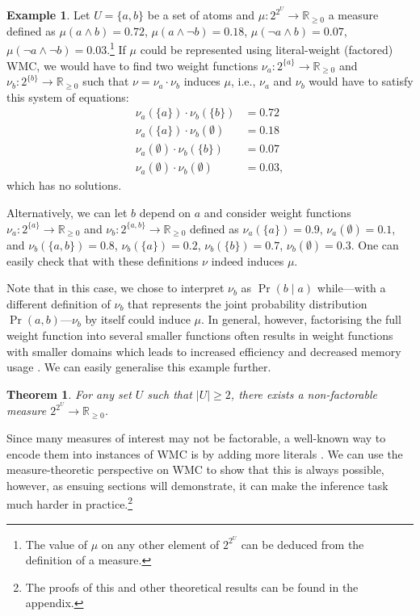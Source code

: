 \documentclass{uai2021} %
\newtheorem{theorem}{Theorem}
\theoremstyle{definition}
\newtheorem{example}{Example}
\begin{document}
\begin{example}
  Let $U = \{a, b\}$ be a set of atoms and $\mu\colon 2^{2^U} \to
  \mathbb{R}_{\ge 0}$ a measure defined as $\mu(a \land b) = 0.72$, $\mu(a \land
  \neg b) = 0.18$, $\mu(\neg a \land b) = 0.07$, $\mu(\neg a \land \neg b) =
  0.03$.\footnote{The value of $\mu$ on any other element of $2^{2^U}$ can be
    deduced from the definition of a measure.} If $\mu$ could be represented
  using literal-weight (factored) WMC, we would have to find two weight
  functions $\nu_a\colon 2^{\{a\}} \to \mathbb{R}_{\ge 0}$ and $\nu_b\colon
  2^{\{b\}} \to \mathbb{R}_{\ge 0}$ such that $\nu = \nu_a \cdot \nu_b$ induces
  $\mu$, i.e., $\nu_a$ and $\nu_b$ would have to satisfy this system of
  equations:
  \begin{align*}
    \nu_a(\{a\}) \cdot \nu_b(\{b\}) &= 0.72 \\
    \nu_a(\{a\}) \cdot \nu_b(\emptyset) &= 0.18 \\
    \nu_a(\emptyset) \cdot \nu_b(\{b\}) &= 0.07 \\
    \nu_a(\emptyset) \cdot \nu_b(\emptyset) &= 0.03,
  \end{align*}
  which has no solutions.

  Alternatively, we can let $b$ depend on $a$ and consider weight functions
  $\nu_a\colon 2^{\{a\}} \to \mathbb{R}_{\ge 0}$ and $\nu_b\colon 2^{\{a, b\}}
  \to \mathbb{R}_{\ge 0}$ defined as $\nu_a(\{a\}) = 0.9$, $\nu_a(\emptyset) =
  0.1$, and $\nu_b(\{a, b\}) = 0.8$, $\nu_b(\{a\}) = 0.2$, $\nu_b(\{b\}) = 0.7$,
  $\nu_b(\emptyset) = 0.3$. One can easily check that with these definitions
  $\nu$ indeed induces $\mu$.
\end{example}

Note that in this case, we chose to interpret $\nu_b$ as $\Pr(b \mid a)$
while---with a different definition of $\nu_b$ that represents the joint
probability distribution $\Pr(a, b)$---$\nu_b$ by itself could induce $\mu$. In
general, however, factorising the full weight function into several smaller
functions often results in weight functions with smaller domains which leads to
increased efficiency and decreased memory usage
\citep{DBLP:conf/aaai/DudekPV20}. We can easily generalise this example further.

\begin{theorem}
  For any set $U$ such that $|U| \ge 2$, there exists a non-factorable measure
  $2^{2^{U}} \to \mathbb{R}_{\ge 0}$.
\end{theorem}

Since many measures of interest may not be factorable, a well-known way to
encode them into instances of WMC is by adding more literals
\citep{DBLP:journals/ai/ChaviraD08}. We can use the measure-theoretic
perspective on WMC to show that this is always possible, however, as ensuing
sections will demonstrate, it can make the inference task much harder in
practice.\footnote{The proofs of this and other theoretical results can be found
  in the appendix.}
\end{document}
